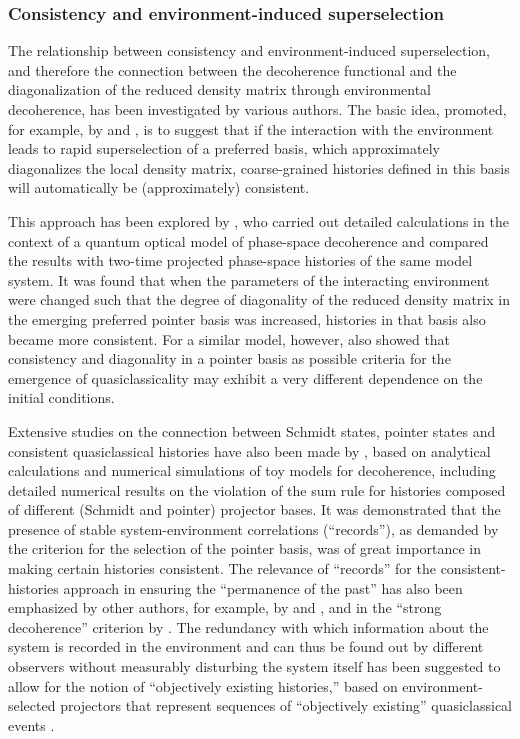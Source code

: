 \documentclass[rmp,aps,amsmath,amsfonts,noshowkeys,noshowpacs,12pt]{revtex4}
\begin{document}
\subsubsection{Consistency and environment-induced superselection}

The relationship between consistency and environment-induced
superselection, and therefore the connection between the decoherence
functional and the diagonalization of the reduced density matrix
through environmental decoherence, has been investigated by various
authors. The basic idea, promoted, for example, by
\citet{Zurek:1993:pu} and \citet{Paz:1993:ww}, is to suggest
that if the interaction with the environment leads to rapid
superselection of a preferred basis, which approximately diagonalizes
the local density matrix, coarse-grained histories defined in this
basis will automatically be (approximately) consistent.

This approach has been explored by \citet{Twamley:1993:bz}, who
carried out detailed calculations in the context of a quantum optical
model of phase-space decoherence and compared the results with
two-time projected phase-space histories of the same model system. It
was found that when the parameters of the interacting environment were
changed such that the degree of diagonality of the reduced density
matrix in the emerging preferred pointer basis was increased,
histories in that basis also became more consistent. For a similar
model, however, \citet{Twamley:1993:cg} also showed that consistency
and diagonality in a pointer basis as possible criteria for the
emergence of quasiclassicality may exhibit a very different dependence
on the initial conditions.

Extensive studies on the connection between Schmidt states, pointer
states and consistent quasiclassical histories have also been made by
\citet{Albrecht:1992:rz,Albrecht:1993:pq}, based on analytical
calculations and numerical simulations of toy models for decoherence,
including detailed numerical results on the violation of the sum rule
for histories composed of different (Schmidt and pointer) projector
bases. It was demonstrated that the presence of stable
system-environment correlations (``records''), as demanded by the
criterion for the selection of the pointer basis, was of great
importance in making certain histories consistent. The relevance of
``records'' for the consistent-histories approach in ensuring the
``permanence of the past'' has also been emphasized by other authors,
for example, by \citet{Paz:1993:ww} and
\citet{Zurek:1993:pu,Zurek:2002:ii}, and in the ``strong decoherence''
criterion by \citet{GellMann:1998:xy}.  The redundancy with which
information about the system is recorded in the environment and can
thus be found out by different observers without measurably disturbing
the system itself has been suggested to allow for the notion of
``objectively existing histories,'' based on environment-selected
projectors that represent sequences of ``objectively existing''
quasiclassical events
\citep{Zurek:1993:pu,Paz:1993:ww,Zurek:2002:ii,Zurek:2003:pl}.
\end{document}
